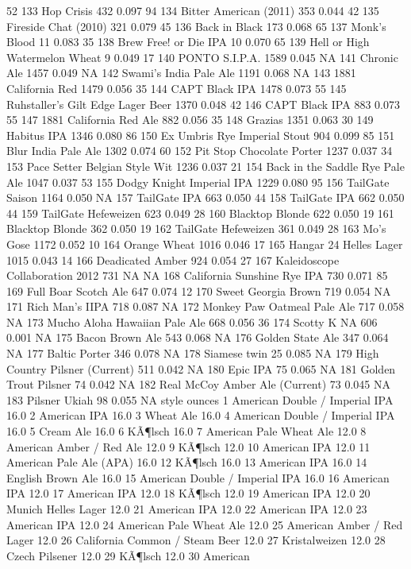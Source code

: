 \documentclass[]{article}
\begin{document}
52 133 Hop Crisis 432 0.097 94 134 Bitter American (2011) 353 0.044 42
135 Fireside Chat (2010) 321 0.079 45 136 Back in Black 173 0.068 65 137
Monk's Blood 11 0.083 35 138 Brew Free! or Die IPA 10 0.070 65 139 Hell
or High Watermelon Wheat 9 0.049 17 140 PONTO S.I.P.A. 1589 0.045 NA 141
Chronic Ale 1457 0.049 NA 142 Swami's India Pale Ale 1191 0.068 NA 143
1881 California Red 1479 0.056 35 144 CAPT Black IPA 1478 0.073 55 145
Ruhstaller's Gilt Edge Lager Beer 1370 0.048 42 146 CAPT Black IPA 883
0.073 55 147 1881 California Red Ale 882 0.056 35 148 Grazias 1351 0.063
30 149 Habitus IPA 1346 0.080 86 150 Ex Umbris Rye Imperial Stout 904
0.099 85 151 Blur India Pale Ale 1302 0.074 60 152 Pit Stop Chocolate
Porter 1237 0.037 34 153 Pace Setter Belgian Style Wit 1236 0.037 21 154
Back in the Saddle Rye Pale Ale 1047 0.037 53 155 Dodgy Knight Imperial
IPA 1229 0.080 95 156 TailGate Saison 1164 0.050 NA 157 TailGate IPA 663
0.050 44 158 TailGate IPA 662 0.050 44 159 TailGate Hefeweizen 623 0.049
28 160 Blacktop Blonde 622 0.050 19 161 Blacktop Blonde 362 0.050 19 162
TailGate Hefeweizen 361 0.049 28 163 Mo's Gose 1172 0.052 10 164 Orange
Wheat 1016 0.046 17 165 Hangar 24 Helles Lager 1015 0.043 14 166
Deadicated Amber 924 0.054 27 167 Kaleidoscope Collaboration 2012 731 NA
NA 168 California Sunshine Rye IPA 730 0.071 85 169 Full Boar Scotch Ale
647 0.074 12 170 Sweet Georgia Brown 719 0.054 NA 171 Rich Man's IIPA
718 0.087 NA 172 Monkey Paw Oatmeal Pale Ale 717 0.058 NA 173 Mucho
Aloha Hawaiian Pale Ale 668 0.056 36 174 Scotty K NA 606 0.001 NA 175
Bacon Brown Ale 543 0.068 NA 176 Golden State Ale 347 0.064 NA 177
Baltic Porter 346 0.078 NA 178 Siamese twin 25 0.085 NA 179 High Country
Pilsner (Current) 511 0.042 NA 180 Epic IPA 75 0.065 NA 181 Golden Trout
Pilsner 74 0.042 NA 182 Real McCoy Amber Ale (Current) 73 0.045 NA 183
Pilsner Ukiah 98 0.055 NA style ounces 1 American Double / Imperial IPA
16.0 2 American IPA 16.0 3 Wheat Ale 16.0 4 American Double / Imperial
IPA 16.0 5 Cream Ale 16.0 6 KÃ¶lsch 16.0 7 American Pale Wheat Ale 12.0
8 American Amber / Red Ale 12.0 9 KÃ¶lsch 12.0 10 American IPA 12.0 11
American Pale Ale (APA) 16.0 12 KÃ¶lsch 16.0 13 American IPA 16.0 14
English Brown Ale 16.0 15 American Double / Imperial IPA 16.0 16
American IPA 12.0 17 American IPA 12.0 18 KÃ¶lsch 12.0 19 American IPA
12.0 20 Munich Helles Lager 12.0 21 American IPA 12.0 22 American IPA
12.0 23 American IPA 12.0 24 American Pale Wheat Ale 12.0 25 American
Amber / Red Lager 12.0 26 California Common / Steam Beer 12.0 27
Kristalweizen 12.0 28 Czech Pilsener 12.0 29 KÃ¶lsch 12.0 30 American
\end{document}
